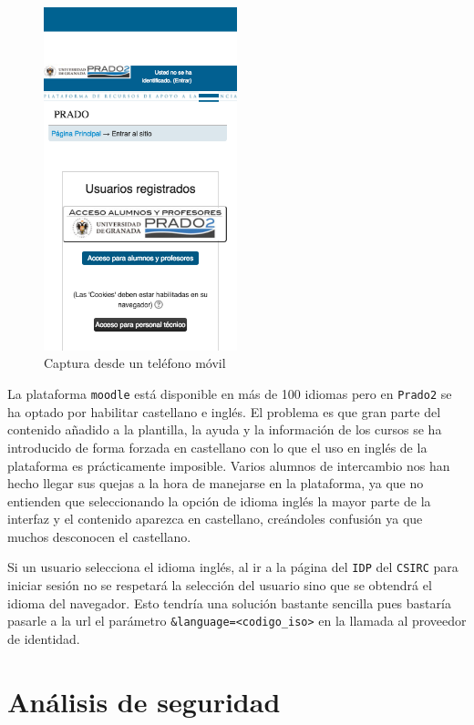 \begin{figure}[H]
\centering
\includegraphics[width=0.5\textwidth]{../screenshots/capturamovil2}
\caption{Captura desde un teléfono móvil}
\label{fig:capturamovil2}
\end{figure}

\bigskip
La plataforma \texttt{moodle} está disponible en más de 100 idiomas pero en \texttt{Prado2} se ha optado por habilitar castellano e inglés. El problema es que gran parte del contenido añadido a la plantilla, la ayuda y la información de los cursos se ha introducido de forma forzada en castellano con lo que el uso en inglés de la plataforma es prácticamente imposible. Varios alumnos de intercambio nos han hecho llegar sus quejas a la hora de manejarse en la plataforma, ya que no entienden que seleccionando la opción de idioma inglés la mayor parte de la interfaz y el contenido aparezca en castellano, creándoles confusión ya que muchos desconocen el castellano.

\bigskip
Si un usuario selecciona el idioma inglés, al ir a la página del \texttt{IDP} del \texttt{CSIRC} para iniciar sesión no se respetará la selección del usuario sino que se obtendrá el idioma del navegador. Esto tendría una solución bastante sencilla pues bastaría pasarle a la url el parámetro \texttt{\&language=<codigo\_iso>} en la llamada al proveedor de identidad.


\section{Análisis de seguridad}

